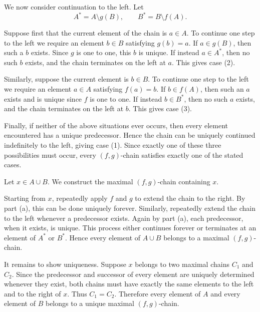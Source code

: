 {{{            We now consider continuation to the left. Let
            \[
            A^* = A \setminus g(B), \qquad
            B^* = B \setminus f(A).
            \]

            Suppose first that the current element of the chain is $a \in A$. To continue one step to the left we require an element $b \in B$ satisfying
            $
            g(b)=a.
            $
            If $a \in g(B)$, then such a $b$ exists. Since $g$ is one to one, this $b$ is unique. If instead $a \in A^*$, then no such $b$ exists, and the chain terminates on the left at $a$. This gives case (2).

            Similarly, suppose the current element is $b \in B$. To continue one step to the left we require an element $a \in A$ satisfying
            $
            f(a)=b.
            $
            If $b \in f(A)$, then such an $a$ exists and is unique since $f$ is one to one. If instead $b \in B^*$, then no such $a$ exists, and the chain terminates on the left at $b$. This gives case (3).

            Finally, if neither of the above situations ever occurs, then every element encountered has a unique predecessor. Hence the chain can be uniquely continued indefinitely to the left, giving case (1). Since exactly one of these three possibilities must occur, every $(f,g)$-chain satisfies exactly one of the stated cases.
            \pagebreak
            \item Let $x \in A \cup B$. We construct the maximal $(f,g)$-chain containing $x$.

            Starting from $x$, repeatedly apply $f$ and $g$ to extend the chain to the right. By part (a), this can be done uniquely forever. 
            Similarly, repeatedly extend the chain to the left whenever a predecessor exists. Again by part (a), each predecessor, when it exists, is unique. 
            This process either continues forever or terminates at an element of $A^*$ or $B^*$. 
            Hence every element of $A \cup B$ belongs to a maximal $(f,g)$-chain.

            It remains to show uniqueness. 
            Suppose $x$ belongs to two maximal chains $C_1$ and $C_2$. Since the predecessor and successor of every element are uniquely determined whenever they exist, 
            both chains must have exactly the same elements to the left and to the right of $x$. Thus $C_1=C_2$.
            Therefore every element of $A$ and every element of $B$ belongs to a unique maximal $(f,g)$-chain.

}}}
